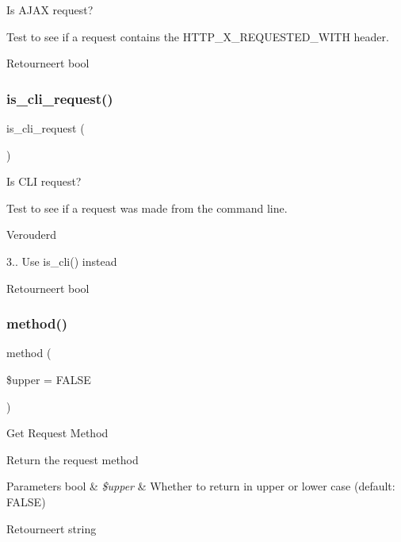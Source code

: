 Is A\+J\+AX request?

Test to see if a request contains the H\+T\+T\+P\+\_\+\+X\+\_\+\+R\+E\+Q\+U\+E\+S\+T\+E\+D\+\_\+\+W\+I\+TH header.

\begin{DoxyReturn}{Retourneert}
bool 
\end{DoxyReturn}
\mbox{\label{class_c_i___input_a70c1e8a081ef955c1a52164634d4f66e}} 
\subsubsection{\texorpdfstring{is\_cli\_request()}{is\_cli\_request()}}
{\footnotesize\ttfamily is\+\_\+cli\+\_\+request (\begin{DoxyParamCaption}{ }\end{DoxyParamCaption})}

Is C\+LI request?

Test to see if a request was made from the command line.

\begin{DoxyRefDesc}{Verouderd}
\item[\mbox{\hyperlink{deprecated__deprecated000002}{Verouderd}}]3.. Use is\+\_\+cli() instead \end{DoxyRefDesc}
\begin{DoxyReturn}{Retourneert}
bool 
\end{DoxyReturn}
\mbox{\label{class_c_i___input_aaa22626885bdf9dda2346ee6422203ef}} 
\subsubsection{\texorpdfstring{method()}{method()}}
{\footnotesize\ttfamily method (\begin{DoxyParamCaption}\item[{}]{\$upper = {\ttfamily FALSE} }\end{DoxyParamCaption})}

Get Request Method

Return the request method


\begin{DoxyParams}[1]{Parameters}
bool & {\em \$upper} & Whether to return in upper or lower case (default\+: F\+A\+L\+SE) \\
\hline
\end{DoxyParams}
\begin{DoxyReturn}{Retourneert}
string 
\end{DoxyReturn}
\mbox{\label{class_c_i___input_abe57ddea9c16f0d9194c82c700c0416f}} 
